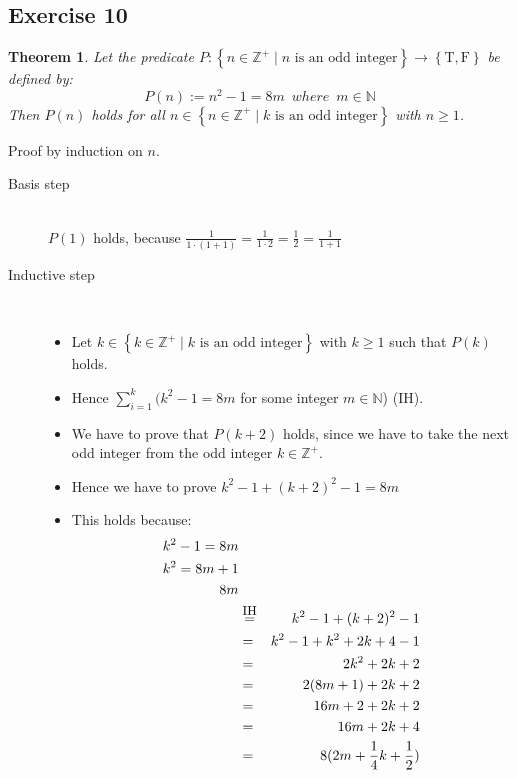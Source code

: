 \documentclass[a4paper]{article}
\newcommand{\exercise}[2]{\subsection*{Exercise #1}{#2}}
\newcommand{\set}[1]{\ensuremath{\left\{{#1}\right\}}}
\newcommand{\setbuild}[2]{\ensuremath{\set{{#1}\mid{#2}}}}
\newcommand{\NN}{\ensuremath{\mathbb{N}}}
\newcommand{\ZZp}{\ensuremath{\mathbb{Z}^{+}}}
\newcommand{\Tt}{\ensuremath{\mathrm T}}
\newcommand{\Ff}{\ensuremath{\mathrm F}}
\newtheorem{theorem}{Theorem}
\newcommand{\templtag}[1]{\marginpar{\fbox{#1}}}
\begin{document}
\exercise{10}{%
\setcounter{theorem}{9}%
\begin{theorem}
Let \templtag{1}%
the predicate $P:\setbuild{n\in \ZZp}{n \mbox{~is an odd integer} }\to\set{\Tt,\Ff}$ be defined by:
\[
P(n) := n^2 - 1 = 8m \enspace where \enspace m \in \NN
\]
Then $P(n)$ holds for all $n\in\setbuild{n\in \ZZp}{k \mbox{~is an odd integer} }$ with $n\geq 1$.
\end{theorem}

Proof \templtag{2}%
by induction on $n$.
\begin{description}
\item[Basis step]~\templtag{3}\\

\medskip %
$P(1)$ holds, \templtag{4}%
because $\frac{1}{1 \cdot (1 + 1)} = \frac{1}{1 \cdot 2} = \frac{1}{2} = \frac{1}{1 + 1}$
\item[Inductive step]~\templtag{5}\\

\medskip
\begin{itemize}
\item
Let \templtag{6}%
$k\in\setbuild{k\in \ZZp}{k \mbox{~is an odd integer} }$ with $k\geq 1$ such that $P(k)$ holds.

\medskip
\item
Hence \templtag{7}%
$\sum^{k}_{i = 1}(k^2 - 1 = 8m$ for some integer $m \in \NN$) (\mbox{IH}).

\medskip
\item
We \templtag{8}%
have to prove that $P(k + 2)$ holds, since we have to take the next odd integer from the odd integer $k \in \ZZp$.

\medskip
\item
Hence \templtag{9}%
we have to prove
$k^2 - 1 + (k + 2)^2 - 1 = 8m$

\medskip
\item
This \templtag{10}%
holds because:
\begin{eqnarray*}
k^2 - 1 = 8m  \\
k^2 = 8m + 1  \\
8m \\
&\stackrel{\small\mbox{IH}}{=} & k^2 - 1 + (k + 2)^2 - 1  \\
&=    & k^2 - 1 + k^2 + 2k + 4 - 1  \\
&=    & 2k^2 + 2k + 2 \\
&=    & 2(8m + 1) + 2k + 2 \\
&=    & 16m + 2 + 2k + 2 \\
&=    & 16m + 2k + 4 \\
&=    & 8(2m + \frac{1}{4}k + \frac{1}{2}) \\
\end{eqnarray*}


\end{itemize}
\end{description}}
\end{document}
